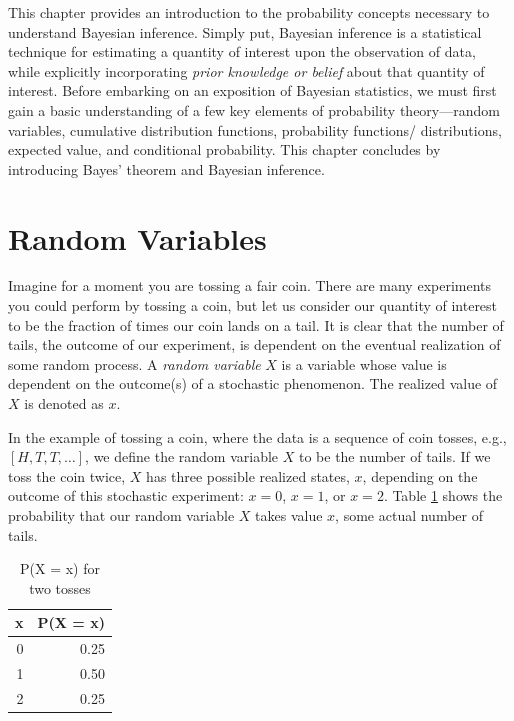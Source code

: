 \documentclass[
  12pt,
  twoside]{book}
\theoremstyle{definition}
\theoremstyle{definition}
\theoremstyle{definition}
\theoremstyle{remark}
\begin{document}
This chapter provides an introduction to the probability concepts necessary to understand Bayesian inference.
Simply put, Bayesian inference is a statistical technique for estimating a quantity of interest upon the observation of data, while explicitly incorporating \emph{prior knowledge or belief} about that quantity of interest.
Before embarking on an exposition of Bayesian statistics, we must first gain a basic understanding of a few key elements of probability theory---random variables, cumulative distribution functions, probability functions/ distributions, expected value, and conditional probability.
This chapter concludes by introducing Bayes' theorem and Bayesian inference.

\hypertarget{random-variables}{%
\section{Random Variables}\label{random-variables}}

Imagine for a moment you are tossing a fair coin.
There are many experiments you could perform by tossing a coin, but let us consider our quantity of interest to be the fraction of times our coin lands on a tail.
It is clear that the number of tails, the outcome of our experiment, is dependent on the eventual realization of some random process.
A \emph{random variable} \(X\) is a variable whose value is dependent on the outcome(s) of a stochastic phenomenon.
The realized value of \(X\) is denoted as \(x\).

In the example of tossing a coin, where the data is a sequence of coin tosses, e.g., \([H, T, T, …]\), we define the random variable \(X\) to be the number of tails.
If we toss the coin twice, \(X\) has three possible realized states, \(x\), depending on the outcome of this stochastic experiment: \(x = 0\), \(x = 1\), or \(x = 2\).
Table \ref{tab:rv} shows the probability that our random variable \(X\) takes value \(x\), some actual number of tails.

\begin{table}[!h]

\caption{\label{tab:rv}P(X = x) for two tosses}
\centering
\begin{tabular}[t]{rr}
\toprule
x & P(X = x)\\
\midrule
0 & 0.25\\
1 & 0.50\\
2 & 0.25\\
\bottomrule
\end{tabular}
\end{table}
\end{document}
